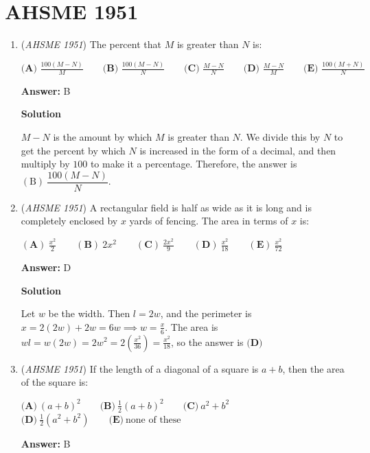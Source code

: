 \section{AHSME 1951}
        \begin{enumerate}
        	\item (\textit{AHSME 1951}) The percent that $M$ is greater than $N$ is:


 $\textbf{(A) \ } \frac {100(M - N)}{M} \qquad \textbf{(B) \ } \frac {100(M - N)}{N} \qquad \textbf{(C) \ } \frac {M - N}{N} \qquad \textbf{(D) \ } \frac {M - N}{M} \qquad \textbf{(E) \ } \frac {100(M + N)}{N}$

 \textbf{Answer: }B



\textbf{Solution}

$M-N$ is the amount by which $M$ is greater than $N$. We divide this by $N$ to get the percent by which $N$ is increased in the form of a decimal, and then multiply by $100$ to make it a percentage. Therefore, the answer is $\boxed{\mathrm{(B)}\ \dfrac{100(M-N)}{N}}$.

 


 


	\item (\textit{AHSME 1951}) A rectangular field is half as wide as it is long and is completely enclosed by $x$ yards of fencing. The area in terms of $x$ is:


 $(\textbf{A})\ \frac{x^2}2 \qquad (\textbf{B})\ 2x^2 \qquad (\textbf{C})\ \frac{2x^2}9 \qquad (\textbf{D})\ \frac{x^2}{18} \qquad (\textbf{E})\ \frac{x^2}{72}$

 \textbf{Answer: }D



\textbf{Solution}

Let $w$ be the width. Then $l = 2w$, and the perimeter is $x = 2(2w)+2w = 6w \implies w = \frac{x}6$. The area is $wl = w(2w) = 2w^2 = 2\left(\frac{x^2}{36}\right) = \frac{x^2}{18}$, so the answer is $\boxed{\textbf{(D)}}$



	\item (\textit{AHSME 1951}) If the length of a diagonal of a square is $a + b$, then the area of the square is:


 $\textbf{(A)}\ (a+b)^{2}\qquad\textbf{(B)}\ \frac{1}{2}(a+b)^{2}\qquad\textbf{(C)}\ a^{2}+b^{2}$
$\textbf{(D)}\ \frac{1}{2}(a^{2}+b^{2})\qquad\textbf{(E)}\ \text{none of these}$

 \textbf{Answer: }B




\end{enumerate}
